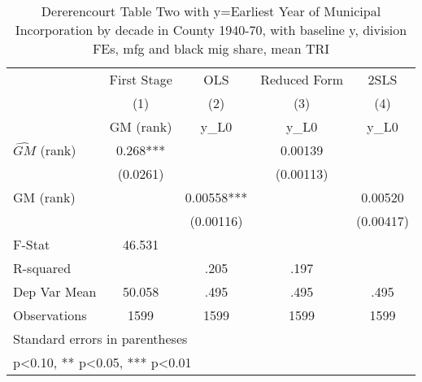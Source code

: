 \begin{table}[htbp]\centering
\def\sym#1{\ifmmode^{#1}\else\(^{#1}\)\fi}
\caption{Dererencourt Table Two with y=Earliest Year of Municipal Incorporation by decade in County 1940-70, with baseline y, division FEs, mfg and black mig share, mean TRI}
\begin{tabular}{l*{4}{c}}
\toprule
                    & First Stage   &         OLS   &Reduced Form   &        2SLS   \\
                    &\multicolumn{1}{c}{(1)}&\multicolumn{1}{c}{(2)}&\multicolumn{1}{c}{(3)}&\multicolumn{1}{c}{(4)}\\
                    &\multicolumn{1}{c}{GM  (rank)}&\multicolumn{1}{c}{y\_L0}&\multicolumn{1}{c}{y\_L0}&\multicolumn{1}{c}{y\_L0}\\
\midrule
$\hat{GM}$ (rank)   &       0.268***&               &     0.00139   &               \\
                    &    (0.0261)   &               &   (0.00113)   &               \\
\addlinespace
GM  (rank)          &               &     0.00558***&               &     0.00520   \\
                    &               &   (0.00116)   &               &   (0.00417)   \\
\midrule
F-Stat              &      46.531   &               &               &               \\
R-squared           &               &        .205   &        .197   &               \\
Dep Var Mean        &      50.058   &        .495   &        .495   &        .495   \\
Observations        &        1599   &        1599   &        1599   &        1599   \\
\bottomrule
\multicolumn{5}{l}{\footnotesize Standard errors in parentheses}\\
\multicolumn{5}{l}{\footnotesize * p<0.10, ** p<0.05, *** p<0.01}\\
\end{tabular}
\end{table}
